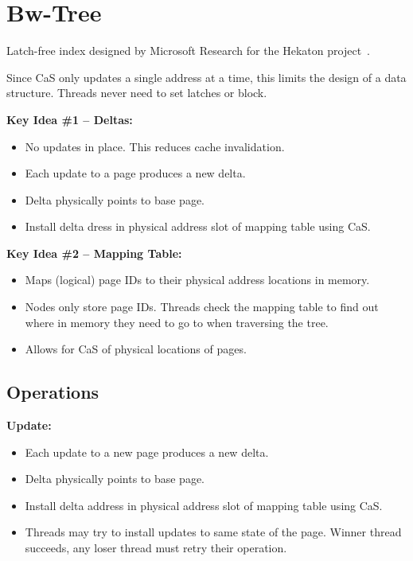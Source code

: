 \documentclass[11pt]{article}
\begin{document}
\section{Bw-Tree}
Latch-free index designed by Microsoft Research for the Hekaton project~\cite{bwtree-icde2013}.

Since CaS only updates a single address at a time, this limits the design of a data structure.
Threads never need to set latches or block.

\textbf{Key Idea \#1 -- Deltas:}
\begin{itemize}
    \item
    No updates in place. This reduces cache invalidation.
    
    \item
    Each update to a page produces a new delta.
    
    \item
    Delta physically points to base page.
    
    \item
    Install delta dress in physical address slot of mapping table using CaS.
\end{itemize}

\textbf{Key Idea \#2 -- Mapping Table:}
\begin{itemize}
    \item
    Maps (logical) page IDs to their physical address locations in memory.
    
    \item
    Nodes only store page IDs. Threads check the mapping table to find out where in memory 
    they need to go to when traversing the tree.

    \item
    Allows for CaS of physical locations of pages.
\end{itemize}

\subsection*{Operations}

\textbf{Update:}
\begin{itemize}
    \item
    Each update to a new page produces a new delta.
    
    \item
    Delta physically points to base page.
    
    \item
    Install delta address in physical address slot of mapping table using CaS.
    
    \item
    Threads may try to install updates to same state of the page.
    Winner thread succeeds, any loser thread must retry their operation.
\end{itemize}
\end{document}

